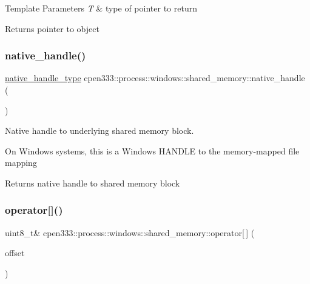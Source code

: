 \begin{DoxyTemplParams}{Template Parameters}
{\em T} & type of pointer to return \\
\hline
\end{DoxyTemplParams}
\begin{DoxyReturn}{Returns}
pointer to object 
\end{DoxyReturn}
\mbox{\label{classcpen333_1_1process_1_1windows_1_1shared__memory_a1827dd03341d7c6afcc02cf078f54e32}} 
\subsubsection{\texorpdfstring{native\+\_\+handle()}{native\_handle()}}
{\footnotesize\ttfamily \hyperlink{classcpen333_1_1process_1_1windows_1_1shared__memory_a4a2507680675101666846b0975fa6899}{native\+\_\+handle\+\_\+type} cpen333\+::process\+::windows\+::shared\+\_\+memory\+::native\+\_\+handle (\begin{DoxyParamCaption}{ }\end{DoxyParamCaption})\hspace{0.3cm}{\ttfamily [inline]}}



Native handle to underlying shared memory block. 

On Windows systems, this is a Windows H\+A\+N\+D\+LE to the memory-\/mapped file mapping

\begin{DoxyReturn}{Returns}
native handle to shared memory block 
\end{DoxyReturn}
\mbox{\label{classcpen333_1_1process_1_1windows_1_1shared__memory_a931719bdcc1558973d6fcb7a79f52f22}} 
\subsubsection{\texorpdfstring{operator[]()}{operator[]()}}
{\footnotesize\ttfamily uint8\+\_\+t\& cpen333\+::process\+::windows\+::shared\+\_\+memory\+::operator\mbox{[}$\,$\mbox{]} (\begin{DoxyParamCaption}\item[{size\+\_\+t}]{offset }\end{DoxyParamCaption})\hspace{0.3cm}{\ttfamily [inline]}}



